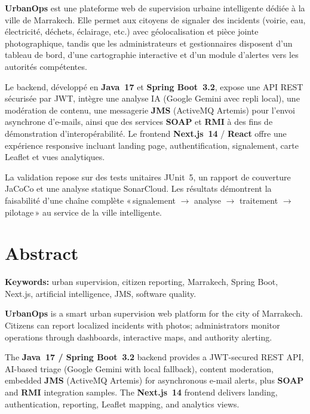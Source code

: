 \documentclass[12pt,a4paper,oneside]{report}
\begin{document}
\medskip
\noindent
\textbf{UrbanOps} est une plateforme web de supervision urbaine intelligente dédiée à la ville de Marrakech. Elle permet aux citoyens de signaler des incidents (voirie, eau, électricité, déchets, éclairage, etc.) avec géolocalisation et pièce jointe photographique, tandis que les administrateurs et gestionnaires disposent d'un tableau de bord, d'une cartographie interactive et d'un module d'alertes vers les autorités compétentes.

Le backend, développé en \textbf{Java~17} et \textbf{Spring Boot~3.2}, expose une API REST sécurisée par JWT, intègre une analyse IA (Google Gemini avec repli local), une modération de contenu, une messagerie \textbf{JMS} (ActiveMQ Artemis) pour l'envoi asynchrone d'e-mails, ainsi que des services \textbf{SOAP} et \textbf{RMI} à des fins de démonstration d'interopérabilité. Le frontend \textbf{Next.js~14} / \textbf{React} offre une expérience responsive incluant landing page, authentification, signalement, carte Leaflet et vues analytiques.

La validation repose sur des tests unitaires JUnit~5, un rapport de couverture JaCoCo et une analyse statique SonarCloud. Les résultats démontrent la faisabilité d'une chaîne complète «\,signalement $\rightarrow$ analyse $\rightarrow$ traitement $\rightarrow$ pilotage\,» au service de la ville intelligente.

\newpage

\chapter*{Abstract}
\textbf{Keywords:} urban supervision, citizen reporting, Marrakech, Spring Boot, Next.js, artificial intelligence, JMS, software quality.

\medskip
\noindent
\textbf{UrbanOps} is a smart urban supervision web platform for the city of Marrakech. Citizens can report localized incidents with photos; administrators monitor operations through dashboards, interactive maps, and authority alerting.

The \textbf{Java~17 / Spring Boot~3.2} backend provides a JWT-secured REST API, AI-based triage (Google Gemini with local fallback), content moderation, embedded \textbf{JMS} (ActiveMQ Artemis) for asynchronous e-mail alerts, plus \textbf{SOAP} and \textbf{RMI} integration samples. The \textbf{Next.js~14} frontend delivers landing, authentication, reporting, Leaflet mapping, and analytics views.
\end{document}
